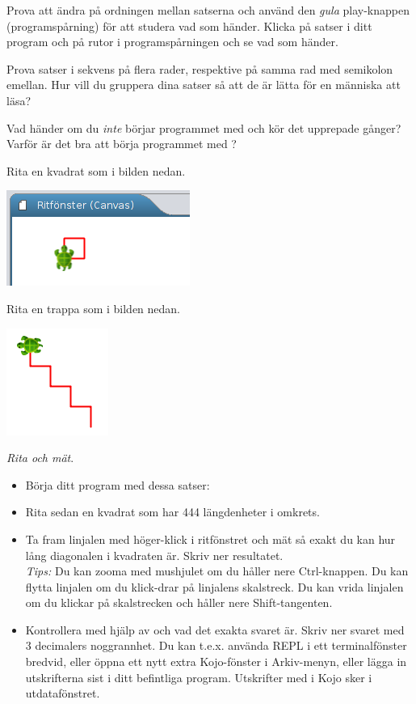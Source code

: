 \Subtask Prova att ändra på ordningen mellan satserna och använd den \emph{gula} play-knappen  (programspårning) för att studera vad som händer. Klicka på satser i ditt program och på rutor i programspårningen och se vad som händer.

\Subtask Prova satser i sekvens på flera rader, respektive på samma rad med semikolon emellan. Hur vill du gruppera dina satser så att de är lätta för en människa att läsa?

\Subtask\Pen Vad händer om du \emph{inte} börjar programmet med  och kör det upprepade gånger? Varför är det bra att börja programmet med ?

\Subtask Rita en kvadrat som i bilden nedan.

\includegraphics{../img/kojo/kvadrat}

\Subtask Rita en trappa som i bilden nedan.

\includegraphics[width=0.25\textwidth]{../img/kojo/stairs}

\Subtask \emph{Rita och mät}.
\begin{itemize}[noitemsep]
\item Börja ditt program med dessa satser:\\ 
\item Rita sedan en kvadrat som har 444 längdenheter i omkrets.
\item Ta fram linjalen med höger-klick i ritfönstret och mät så exakt du kan hur lång diagonalen i kvadraten är. Skriv ner resultatet. \\ \emph{Tips:} Du kan zooma med mushjulet om du håller nere Ctrl-knappen. Du kan flytta linjalen om du klick-drar på linjalens skalstreck. Du kan vrida linjalen om du klickar på skalstrecken och håller nere Shift-tangenten.
\item Kontrollera med hjälp av  och  vad det exakta svaret är. Skriv ner svaret med 3 decimalers noggrannhet. Du kan t.e.x. använda REPL i ett terminalfönster bredvid, eller öppna ett nytt extra Kojo-fönster i Arkiv-menyn, eller lägga in utskrifterna sist i ditt befintliga program. Utskrifter med  i Kojo sker i utdatafönstret. 
\end{itemize}

